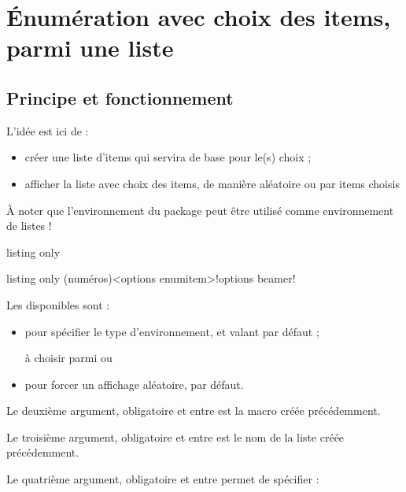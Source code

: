 \documentclass[french,11pt,a4paper]{article}
\begin{document}
\pagebreak

\section{Énumération avec choix des items, parmi une liste}

\subsection{Principe et fonctionnement}

L'idée est ici de :

\begin{itemize}
	\item créer une liste d'items qui servira de base pour le(s) choix ;
	\item afficher la liste avec choix des items, de manière aléatoire ou par items choisis
\end{itemize}

À noter que l'environnement  du package peut être utilisé comme environnement de listes !

\begin{DemoCode}{listing only}
\end{DemoCode}

\begin{DemoCode}{listing only}
(numéros)<options enumitem>!options beamer!
\end{DemoCode}

Les  disponibles sont :

\begin{itemize}
	\item {} pour spécifier le type d'environnement, et valant  par défaut ;
	
	\hfill{}à choisir parmi   ou 
	\item {} pour forcer un affichage aléatoire,  par défaut.
\end{itemize}

Le deuxième argument, obligatoire et entre  est la macro créée précédemment.

Le troisième argument, obligatoire et entre  est le nom de la liste créée précédemment.

Le quatrième argument, obligatoire et entre  permet de spécifier :
\end{document}
